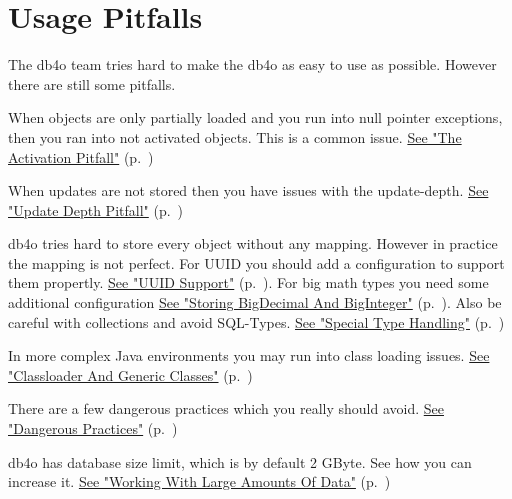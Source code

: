 
\chapter{Usage Pitfalls}
\label{ref:usage-pitfalls}

The db4o team tries hard to make the db4o as easy to use as possible. However there are still some pitfalls.

When objects are only partially loaded and you run into null pointer exceptions, then you ran into not activated objects. This is a common issue. \hyperref[ref:usage-pitfalls-activation-depth]{See "The Activation Pitfall"} (p.~\pageref{ref:usage-pitfalls-activation-depth})

When updates are not stored then you have issues with the update-depth. \hyperref[ref:usage-pitfalls-update-depth]{See "Update Depth Pitfall"} (p.~\pageref{ref:usage-pitfalls-update-depth})

db4o tries hard to store every object without any mapping. However in practice the mapping is not perfect. For UUID you should add a configuration to support them propertly. \hyperref[ref:advanced-topics-type-handling-uuid-support]{See "UUID Support"} (p.~\pageref{ref:advanced-topics-type-handling-uuid-support}). For big math types you need some additional configuration \hyperref[ref:usage-pitfalls-storing-bigdecimal]{See "Storing BigDecimal And BigInteger"} (p.~\pageref{ref:usage-pitfalls-storing-bigdecimal}). Also be careful with collections and avoid SQL-Types. \hyperref[ref:usage-pitfalls-special-type-handling]{See "Special Type Handling"} (p.~\pageref{ref:usage-pitfalls-special-type-handling})

In more complex Java environments you may run into class loading issues. \hyperref[ref:usage-pitfalls-classloader-and-generic-classes]{See "Classloader And Generic Classes"} (p.~\pageref{ref:usage-pitfalls-classloader-and-generic-classes})

There are a few dangerous practices which you really should avoid. \hyperref[ref:usage-pitfalls-dangerous-practices]{See "Dangerous Practices"} (p.~\pageref{ref:usage-pitfalls-dangerous-practices})

db4o has database size limit, which is by default 2 GByte. See how you can increase it. \hyperref[ref:usage-pitfalls-working-with-large-amounts-of-data]{See "Working With Large Amounts Of Data"} (p.~\pageref{ref:usage-pitfalls-working-with-large-amounts-of-data})

